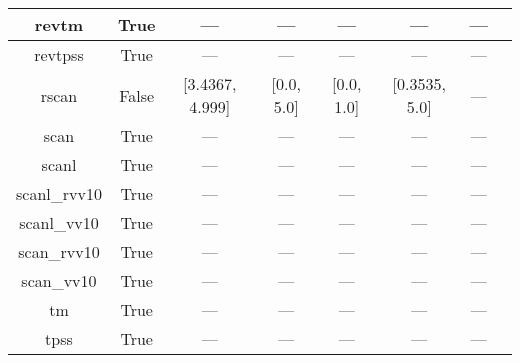 \begin{tabular}{|c|c|c|c|c|c|c|l|}
        revtm &                  True &              --- &              --- &           --- &            --- &        --- &                                                               \cite{Jana2019_6356} \\ \hline
      revtpss &                  True &              --- &              --- &           --- &            --- &        --- &                                     \cite{Perdew2009_026403,Perdew2009_026403_err} \\ \hline
        rscan &                 False &  [3.4367, 4.999] &       [0.0, 5.0] &    [0.0, 1.0] &  [0.3535, 5.0] &        --- &                                                           \cite{Bartok2019_161101} \\ \hline
         scan &                  True &              --- &              --- &           --- &            --- &        --- &                                                              \cite{Sun2015_036402} \\ \hline
        scanl &                  True &              --- &              --- &           --- &            --- &        --- &                            \cite{Mejia2017_052512,Mejia2018_115161,Sun2015_036402} \\ \hline
 scanl\_rvv10 &                  True &              --- &              --- &           --- &            --- &        --- &                           \cite{Mejia2017_052512,Mejia2018_115161,Peng2016_041005} \\ \hline
  scanl\_vv10 &                  True &              --- &              --- &           --- &            --- &        --- &                    \cite{Mejia2017_052512,Mejia2018_115161,Brandenburg2016_115144} \\ \hline
  scan\_rvv10 &                  True &              --- &              --- &           --- &            --- &        --- &                                                             \cite{Peng2016_041005} \\ \hline
   scan\_vv10 &                  True &              --- &              --- &           --- &            --- &        --- &                                                      \cite{Brandenburg2016_115144} \\ \hline
           tm &                  True &              --- &              --- &           --- &            --- &        --- &                                                              \cite{Tao2016_073001} \\ \hline
         tpss &                  True &              --- &              --- &           --- &            --- &        --- &                                              \cite{Tao2003_146401,Perdew2004_6898} \\ \hline

\end{tabular}
